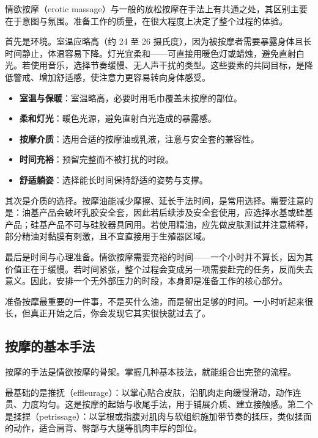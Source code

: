 \documentclass[12pt,UTF8]{ctexbook}
\newcommand{\keyword}[1]{\textbf{#1}}
\begin{document}
情欲按摩（erotic massage）与一般的放松按摩在手法上有共通之处，其区别主要在于意图与氛围。准备工作的质量，在很大程度上决定了整个过程的体验。

首先是环境。室温应略高（约 24 至 26 摄氏度），因为被按摩者需要暴露身体且长时间静止，体温容易下降。灯光宜柔和——可直接用暖色灯或蜡烛，避免直射白光。若使用音乐，选择节奏缓慢、无人声干扰的类型。这些要素的共同目标，是降低警戒、增加舒适感，使注意力更容易转向身体感受。

\begin{itemize}
  \item \keyword{室温与保暖}：室温略高，必要时用毛巾覆盖未按摩的部位。
  \item \keyword{柔和灯光}：暖色光源，避免直射白光造成的暴露感。
  \item \keyword{按摩介质}：选用合适的按摩油或乳液，注意与安全套的兼容性。
  \item \keyword{时间充裕}：预留完整而不被打扰的时段。
  \item \keyword{舒适躺姿}：选择能长时间保持舒适的姿势与支撑。
\end{itemize}

其次是介质的选择。按摩油能减少摩擦、延长手法时间，是常用选择。需要注意的是：油基产品会破坏乳胶安全套，因此若后续涉及安全套使用，应选择水基或硅基产品；硅基产品不可与硅胶器具同用。若使用精油，应先做皮肤测试并注意稀释，部分精油对黏膜有刺激，且不宜直接用于生殖器区域。

最后是时间与心理准备。情欲按摩需要充裕的时间——一个小时并不算长，因为其价值正在于缓慢。若时间紧张，整个过程会变成另一项需要赶完的任务，反而失去意义。因此，安排一个无外部压力的时段，本身即是准备工作的核心部分。

\begin{tcolorbox}[colback=pink!5!white,colframe=red!50!black,title=贴心小叮咛]
准备按摩最重要的一件事，不是买什么油，而是留出足够的时间。一小时听起来很长，但真正开始之后，你会发现它其实很快就过去了。
\end{tcolorbox}
\subsection{按摩的基本手法}

按摩的手法是情欲按摩的骨架。掌握几种基本技法，就能组合出完整的流程。

最基础的是推抚（effleurage）：以掌心贴合皮肤，沿肌肉走向缓慢滑动，动作连贯、力度均匀。这是按摩的起始与收尾手法，用于铺展介质、建立接触感。第二个是揉捏（petrissage）：以掌根或指腹对肌肉与软组织施加带节奏的揉压，类似揉面的动作，适合肩背、臀部与大腿等肌肉丰厚的部位。
\end{document}

